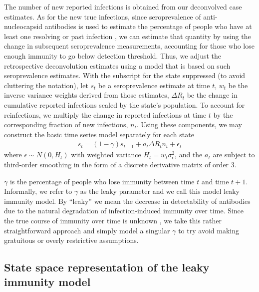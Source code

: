 \documentclass{article}
\begin{document}
The number of new reported infections is obtained from our
deconvolved case estimates. As for the new true
infections, since seroprevalence of anti-nucleocapsid antibodies is used to
estimate the percentage of people who have at least one resolving or past
infection \citep{cdc2020data}, we can estimate that quantity by using 
the change in subsequent seroprevalence measurements, accounting for
those who lose enough immunity to go below detection threshold.
Thus, we adjust the retrospective deconvolution estimates using a model that is 
based on such seroprevalence estimates. 
With the subscript for the state suppressed (to avoid 
cluttering the notation), let $s_t$ be a seroprevalence estimate at time $t$, 
$w_t$ be the inverse variance weights derived from those estimates,
$\Delta R_t$ be the change in cumulative reported infections 
scaled by the state’s population. To account for reinfections, we multiply the 
change in reported infections at time $t$ by the corresponding fraction
of new infections, $n_t$. Using these components, we may construct the basic
time series model separately for each state
\begin{align}
s_t = (1 -\gamma)s_{t-1} + a_t\Delta R_t n_t + \epsilon_t \label{eq:leakypr}
\end{align}
where $\epsilon \sim N(0, H_t)$ with weighted variance $H_t = w_{t}\sigma^2_\epsilon$,
and the $a_t$ are subject to third-order smoothing in the form of a
discrete derivative matrix of order $3$. 

$\gamma$ is the percentage of people who lose immunity between time $t$ and time $t+1$.
Informally, we refer to $\gamma$ as the leaky parameter and we call this model leaky 
immunity model. By ``leaky'' we mean the decrease in detectability of antibodies 
due to the natural degradation of infection-induced
immunity over time. Since the true course of immunity over time is unknown
\citep{goldberg2022protection}, we take this rather straightforward approach 
and simply model a singular $\gamma$ to try
avoid making gratuitous or overly restrictive assumptions.

\subsection{State space representation of the leaky immunity model}
\end{document}
